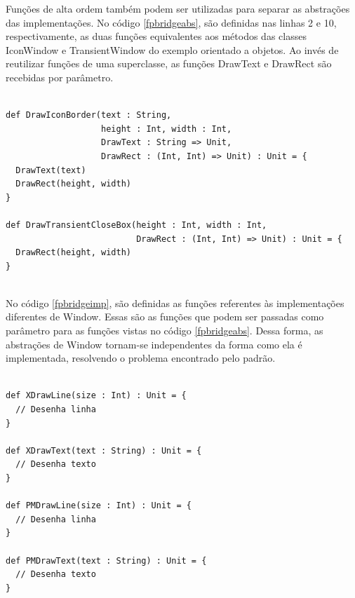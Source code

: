 Funções de alta ordem também podem ser utilizadas 
para separar as abstrações das implementações. 
No código \ref{fpbridgeabs}, são definidas nas 
linhas 2 e 10, respectivamente, as 
duas funções equivalentes aos métodos das 
classes IconWindow e TransientWindow do exemplo 
orientado a objetos. Ao invés de reutilizar 
funções de uma superclasse, as funções 
DrawText e DrawRect são recebidas por parâmetro.

\begin{lstlisting}[caption={Abstrações no Bridge Funcional},label=fpbridgeabs]
    
def DrawIconBorder(text : String,
                   height : Int, width : Int,
                   DrawText : String => Unit,
                   DrawRect : (Int, Int) => Unit) : Unit = {
  DrawText(text)
  DrawRect(height, width)
}

def DrawTransientCloseBox(height : Int, width : Int,
                          DrawRect : (Int, Int) => Unit) : Unit = {
  DrawRect(height, width)
}
    
\end{lstlisting}

No código \ref{fpbridgeimp}, são definidas as 
funções referentes às implementações diferentes 
de Window. Essas são as funções que podem ser 
passadas como parâmetro para as funções vistas 
no código \ref{fpbridgeabs}. Dessa forma, as 
abstrações de Window tornam-se independentes 
da forma como ela é implementada, resolvendo 
o problema encontrado pelo padrão.

\begin{lstlisting}[caption={Implementaçoes no Bridge Funcional},label=fpbridgeimp]
    
def XDrawLine(size : Int) : Unit = {
  // Desenha linha
}

def XDrawText(text : String) : Unit = {
  // Desenha texto
}

def PMDrawLine(size : Int) : Unit = {
  // Desenha linha
}

def PMDrawText(text : String) : Unit = {
  // Desenha texto
}
    
\end{lstlisting}